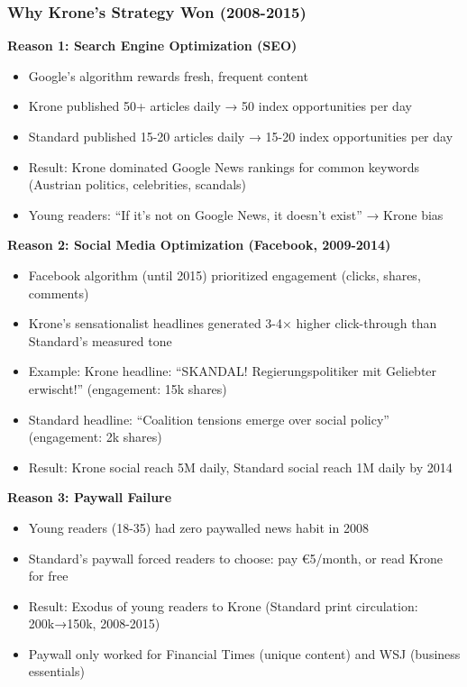 {\subsubsection*{Why Krone's Strategy Won (2008-2015)}

\textbf{Reason 1: Search Engine Optimization (SEO)}

\begin{itemize}
\item Google's algorithm rewards fresh, frequent content
\item Krone published 50+ articles daily → 50 index opportunities per day
\item Standard published 15-20 articles daily → 15-20 index opportunities per day
\item Result: Krone dominated Google News rankings for common keywords (Austrian politics, celebrities, scandals)
\item Young readers: ``If it's not on Google News, it doesn't exist'' → Krone bias
\end{itemize}

\textbf{Reason 2: Social Media Optimization (Facebook, 2009-2014)}

\begin{itemize}
\item Facebook algorithm (until 2015) prioritized engagement (clicks, shares, comments)
\item Krone's sensationalist headlines generated 3-4× higher click-through than Standard's measured tone
\item Example: Krone headline: ``SKANDAL! Regierungspolitiker mit Geliebter erwischt!'' (engagement: 15k shares)
\item Standard headline: ``Coalition tensions emerge over social policy'' (engagement: 2k shares)
\item Result: Krone social reach 5M daily, Standard social reach 1M daily by 2014
\end{itemize}

\textbf{Reason 3: Paywall Failure}

\begin{itemize}
\item Young readers (18-35) had zero paywalled news habit in 2008
\item Standard's paywall forced readers to choose: pay €5/month, or read Krone for free
\item Result: Exodus of young readers to Krone (Standard print circulation: 200k→150k, 2008-2015)
\item Paywall only worked for Financial Times (unique content) and WSJ (business essentials)
\end{itemize}

}
